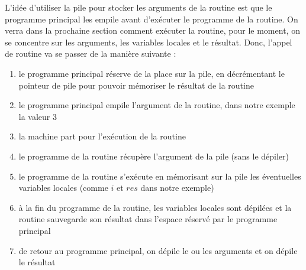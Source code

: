L'idée d'utiliser la pile pour stocker les arguments de la routine est que le programme principal les empile avant d'exécuter le programme de la routine. On verra dans la prochaine section comment exécuter la routine, pour le moment, on se concentre sur les arguments, les variables locales et le résultat. Donc, l'appel de routine va se passer de la manière suivante :
\begin{enumerate}
\item le programme principal réserve de la place sur la pile, en décrémentant le pointeur de pile pour pouvoir mémoriser le résultat de la routine
\item le programme principal empile l'argument de la routine, dans notre exemple la valeur 3
\item la machine part pour l'exécution de la routine 
\item le programme de la routine récupère l'argument de la pile (sans le dépiler)
\item le programme de la routine s'exécute en mémorisant sur la pile les éventuelles variables locales (comme $i$ et $res$ dans notre exemple)
\item à la fin du programme de la routine, les variables locales sont dépilées et la routine sauvegarde son résultat dans l'espace réservé par le programme principal
\item de retour au programme principal, on dépile le ou les arguments et on dépile le résultat
\end{enumerate}

